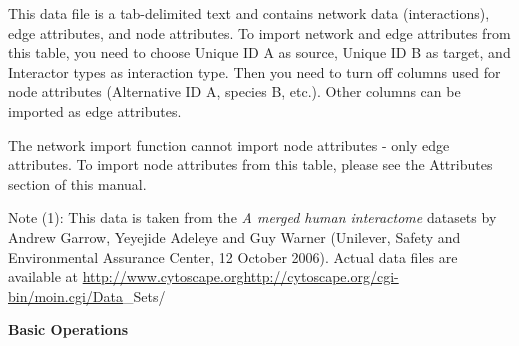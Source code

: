  This data file is a tab-delimited text and contains network data (interactions), edge attributes, and node attributes. To import network and edge attributes from this table, you need to choose Unique ID A as source, Unique ID B as target, and Interactor types as interaction type. Then you need to turn off columns used for node attributes (Alternative ID A, species B, etc.). Other columns can be imported as edge attributes. 


 The network import function cannot import node attributes - only edge attributes. To import node attributes from this table, please see the Attributes section of this manual. 


 Note (1): This data is taken from the \emph{A merged human interactome}
 datasets by Andrew Garrow, Yeyejide Adeleye and Guy Warner (Unilever, Safety and Environmental Assurance Center, 12 October 2006). Actual data files are available at \url{http://www.cytoscape.orghttp://cytoscape.org/cgi-bin/moin.cgi/Data}\_Sets/


 
\textbf{Basic Operations}


